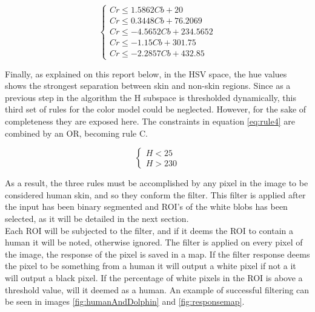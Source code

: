 \begin{equation}
		\begin{cases}
			Cr \le 1.5862  Cb + 20         \\
			Cr \le 0.3448  Cb + 76.2069     \\
			Cr \le -4.5652  Cb + 234.5652   \\
			Cr \le -1.15 Cb + 301.75       \\
			Cr \le -2.2857 Cb + 432.85
			\end{cases}
		\label{eq:rule3}
\end{equation}

Finally, as explained on this report below, in the HSV space, the hue values shows the strongest
separation between skin and non-skin regions. 
Since as a previous step in the algorithm the H subspace is thresholded dynamically,
this third set of rules for the color model could be neglected. However, for the sake of completeness they are exposed here.
The constraints in equation \ref{eq:rule4} are combined by an OR, becoming rule C.

\begin{equation}
		\begin{cases}
			H < 25   \\
			H > 230
		\end{cases}
	\label{eq:rule4}
\end{equation}

As a result, the three rules must be accomplished by any pixel in the image to be considered human skin,
and so they conform the filter.
This filter is applied after the input has been binary segmented and  ROI's of the white blobs has been selected,
as it will be detailed in the next section.\\

Each ROI will be subjected to the filter, and if it deems the ROI to contain a human it will be noted, otherwise ignored. 
The filter is applied on every pixel of the image, the response of the pixel is saved in a map. 
If the filter response deems the pixel to be something from a human it will output a white pixel if not a it will output a black pixel.  
If the percentage of white pixels in the ROI is above a threshold value, will it deemed as a human.
An example of successful filtering can be seen in images \ref{fig:humanAndDolphin} and \ref{fig:responsemap}. 

